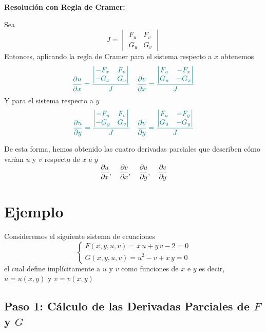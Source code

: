 \documentclass{article}
\begin{document}
\medskip
\noindent \textbf{Resolución con Regla de Cramer:}

Sea
\[
J = \begin{vmatrix}
F_u & F_v \\
G_u & G_v
\end{vmatrix}
\]
Entonces, aplicando la regla de Cramer para el sistema respecto a \( x \) obtenemos
\[\color{teal}
\frac{\partial u}{\partial x} =
\frac{
\begin{vmatrix}
- F_x & F_v \\
- G_x & G_v
\end{vmatrix}
}{J}
\quad
\frac{\partial v}{\partial x} =
\frac{
\begin{vmatrix}
F_u & - F_x \\
G_u & - G_x
\end{vmatrix}
}{J}
\]
Y para el sistema respecto a \( y \)
\[\color{teal}
\frac{\partial u}{\partial y} =
\frac{
\begin{vmatrix}
- F_y & F_v \\
- G_y & G_v
\end{vmatrix}
}{J}
\quad
\frac{\partial v}{\partial y} =
\frac{
\begin{vmatrix}
F_u & - F_y \\
G_u & - G_y
\end{vmatrix}
}{J}
\]

De esta forma, hemos obtenido las cuatro derivadas parciales que describen cómo varían \( u \) y \( v \) respecto de \( x \) e \( y \)
\[
\frac{\partial u}{\partial x},\quad \frac{\partial v}{\partial x},\quad \frac{\partial u}{\partial y},\quad \frac{\partial v}{\partial y}
\]


\section*{Ejemplo}

Consideremos el siguiente sistema de ecuaciones
\[
\begin{cases}
F(x,y,u,v)= x\,u + y\,v - 2 = 0 \\
G(x,y,u,v)= u^2 - v + x\,y = 0
\end{cases}
\]
el cual define implícitamente a \(u\) y \(v\) como funciones de \(x\) e \(y\) es decir, \(u = u(x,y)\) y \(v = v(x,y)\)

\subsection*{Paso 1: Cálculo de las Derivadas Parciales de \(F\) y \(G\)}
\end{document}
